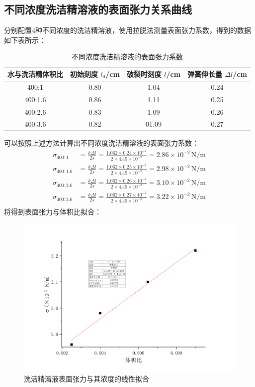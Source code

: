 \documentclass[a4paper]{extarticle}
\begin{document}
    \subsection{不同浓度洗洁精溶液的表面张力关系曲线}
    分别配置4种不同浓度的洗洁精溶液，使用拉脱法测量表面张力系数，得到的数据如下表所示：
    \begin{table}[H]
        \centering
        \caption{不同浓度洗洁精溶液的表面张力系数}
        \begin{tabular}{cccc}
            \toprule
            水与洗洁精体积比 & 初始刻度 $l_0$/cm & 破裂时刻度 $l$/cm & 弹簧伸长量 $\Delta l$/cm\\
            \midrule
            400:1 & 0.80 & 1.04 & 0.24\\
            400:1.6 & 0.86 & 1.11 & 0.25\\
            400:2.6 & 0.83 & 1.09 & 0.26\\
            400:3.6 & 0.82 & 01.09 & 0.27\\
            \bottomrule
        \end{tabular}
    \end{table}
    可以按照上述方法计算出不同浓度洗洁精溶液的表面张力系数：
    \begin{equation*}
        \begin{aligned}
            \sigma_{400:1} &= \frac{k\Delta l}{2s} =\frac{1.062\times0.24\times10^{-2}}{2\times4.45\times10^{-2}}=2.86\times10^{-2} \,\text{N/m}\\
            \sigma_{400:1.6} &= \frac{k\Delta l}{2s} =\frac{1.062\times0.25\times10^{-2}}{2\times4.45\times10^{-2}}=2.98\times10^{-2} \,\text{N/m}\\
            \sigma_{400:2.6} &= \frac{k\Delta l}{2s} =\frac{1.062\times0.26\times10^{-2}}{2\times4.45\times10^{-2}}=3.10\times10^{-2} \,\text{N/m}\\
            \sigma_{400:3.6} &= \frac{k\Delta l}{2s} =\frac{1.062\times0.27\times10^{-2}}{2\times4.45\times10^{-2}}=3.22\times10^{-2} \,\text{N/m}\\            
        \end{aligned}
    \end{equation*}
    将得到表面张力与体积比拟合：
    \begin{figure}[H]
        \centering
        \includegraphics[width=0.8\linewidth]{2.png}
        \caption{洗洁精溶液表面张力与其浓度的线性拟合}
    \end{figure}
\end{document}
